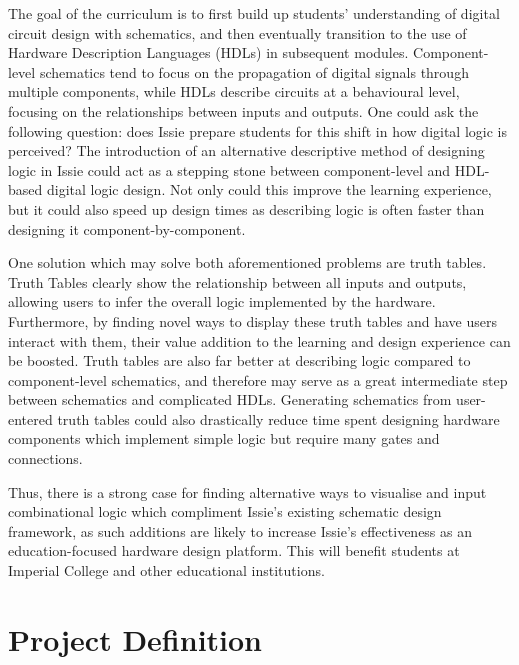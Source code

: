 The goal of the curriculum is to first build up students' understanding of digital circuit design with schematics, and then eventually transition to the use of Hardware Description Languages (HDLs) in subsequent modules. Component-level schematics tend to focus on the propagation of digital signals through multiple components, while HDLs describe circuits at a behavioural level, focusing on the relationships between inputs and outputs. One could ask the following question: does Issie prepare students for this shift in how digital logic is perceived? The introduction of an alternative descriptive method of designing logic in Issie could act as a stepping stone between component-level and HDL-based digital logic design. Not only could this improve the learning experience, but it could also speed up design times as describing logic is often faster than designing it component-by-component.

One solution which may solve both aforementioned problems are truth tables. Truth Tables clearly show the relationship between all inputs and outputs, allowing users to infer the overall logic implemented by the hardware. Furthermore, by finding novel ways to display these truth tables and have users interact with them, their value addition to the learning and design experience can be boosted. Truth tables are also far better at describing logic compared to component-level schematics, and therefore may serve as a great intermediate step between schematics and complicated HDLs. Generating schematics from user-entered truth tables could also drastically reduce time spent designing hardware components which implement simple logic but require many gates and connections.

Thus, there is a strong case for finding alternative ways to visualise and input combinational logic which compliment Issie's existing schematic design framework, as such additions are likely to increase Issie's effectiveness as an education-focused hardware design platform. This will benefit students at Imperial College and other educational institutions.

\section{Project Definition}

